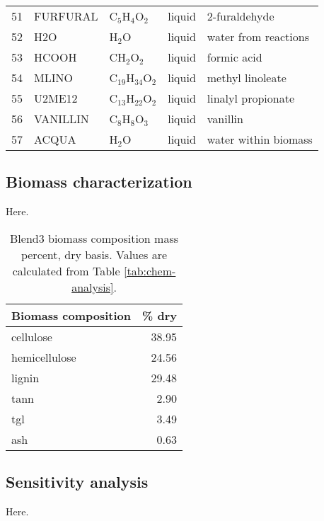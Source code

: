 \begin{center}
\begin{longtable}{cllll}
        51 & FURFURAL       & C$_5$H$_4$O$_2$         & \cellcolor{blue!25}liquid        & 2-furaldehyde \\
        52 & H2O            & H$_2$O                  & \cellcolor{blue!25}liquid        & water from reactions \\
        53 & HCOOH          & CH$_2$O$_2$             & \cellcolor{blue!25}liquid        & formic acid \\
        54 & MLINO          & C$_{19}$H$_{34}$O$_2$   & \cellcolor{blue!25}liquid        & methyl linoleate \\
        55 & U2ME12         & C$_{13}$H$_{22}$O$_2$   & \cellcolor{blue!25}liquid        & linalyl propionate \\
        56 & VANILLIN       & C$_8$H$_8$O$_3$         & \cellcolor{blue!25}liquid        & vanillin \\
        57 & ACQUA          & H$_2$O                  & \cellcolor{blue!25}liquid        & water within biomass \\
        \bottomrule
    \end{longtable}
\end{center}

\subsection{Biomass characterization}

Here.

\begin{table}[H]
    \centering
    \caption{Blend3 biomass composition mass percent, dry basis. Values are calculated from Table \ref{tab:chem-analysis}.}
    \begin{tabular}{lr}
        \toprule
        Biomass composition & \% dry \\
        \midrule
        cellulose     & 38.95 \\
        hemicellulose & 24.56 \\
        lignin        & 29.48 \\
        tann          & 2.90  \\
        tgl           & 3.49  \\
        ash           & 0.63  \\
        \bottomrule
    \end{tabular}
\end{table}

\subsection{Sensitivity analysis}

Here.

